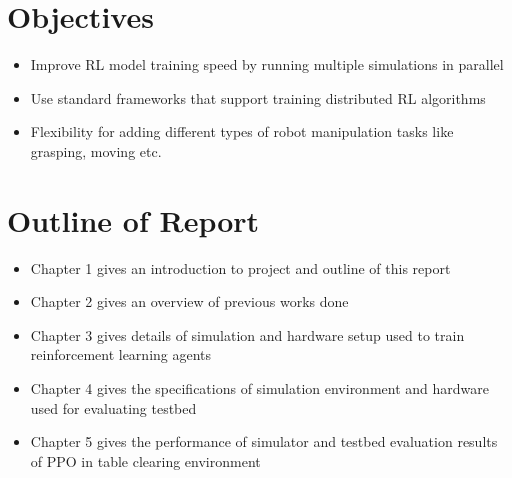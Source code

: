 \section{Objectives}
\begin{itemize}
	\item Improve RL model training speed by running multiple simulations in parallel
	\item Use standard frameworks that support training distributed RL algorithms
	\item Flexibility for adding different types of robot manipulation tasks like grasping, moving etc.
\end{itemize}

\section{Outline of Report}
\begin{itemize}
	\item Chapter 1 gives an introduction to project and outline of this report
	\item Chapter 2 gives an overview of previous works done
	\item Chapter 3 gives details of simulation and hardware setup used to train reinforcement learning agents
	\item Chapter 4 gives the specifications of simulation environment and hardware used for evaluating testbed
	\item Chapter 5 gives the performance of simulator and testbed evaluation results of PPO in table clearing environment
\end{itemize}